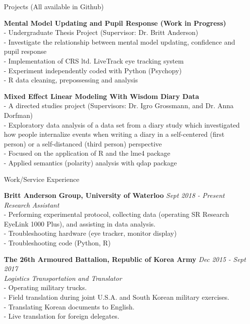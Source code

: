 \documentclass{resume} %
\begin{document}
\begin{rSection}{Projects (All available in Github)}

	{\bf Mental Model Updating and Pupil Response (Work in Progress)}
	\\- Undergraduate Thesis Project (Supervisor: Dr. Britt Anderson)
	\\- Investigate the relationship between mental model updating, confidence and pupil response
	\\- Implementation of CRS ltd. LiveTrack eye tracking system
	\\- Experiment independently coded with Python (Psychopy)
	\\- R data cleaning, prepossessing and analysis
	
	{\bf Mixed Effect Linear Modeling With Wisdom Diary Data}
	\\- A directed studies project (Supervisors: Dr. Igro Grossmann, and Dr. Anna Dorfman)
	\\- Exploratory data analysis of a data set from a diary study which investigated how people internalize events when writing a diary in a self-centered (first person) or a self-distanced (third person) perspective
	\\- Focused on the application of R and the lme4 package
	\\- Applied semantics (polarity) analysis with qdap package

\end{rSection}


\begin{rSection}{Work/Service Experience}

	{\bf Britt Anderson Group, University of Waterloo} \hfill {\em Sept 2018 - Present} 
	\\{\textit{Research Assistant}}
	\\- Performing experimental protocol, collecting data (operating SR Research EyeLink 1000 Plus), and assisting in data analysis.
	\\- Troubleshooting hardware (eye tracker, monitor display)
	\\- Troubleshooting code (Python, R)
	
	
	{\bf The 26th Armoured Battalion, Republic of Korea Army} \hfill {\em Dec 2015 - Sept 2017} 
	\\{\textit{Logistics Transportation and Translator}}
	\\- Operating military trucks.
	\\- Field translation during joint U.S.A. and South Korean military exercises.
	\\- Translating Korean documents to English.
	\\- Live translation for foreign delegates.

\end{rSection}
\end{document}
